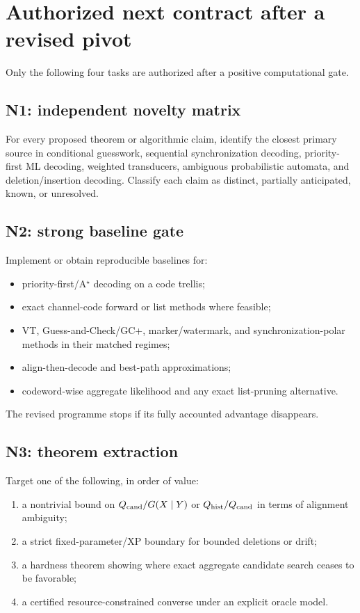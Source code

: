 \documentclass[11pt]{article}
\begin{document}
\section{Authorized next contract after a revised pivot}
Only the following four tasks are authorized after a positive computational gate.

\subsection{N1: independent novelty matrix}
For every proposed theorem or algorithmic claim, identify the closest primary source in conditional guesswork, sequential synchronization decoding, priority-first ML decoding, weighted transducers, ambiguous probabilistic automata, and deletion/insertion decoding. Classify each claim as distinct, partially anticipated, known, or unresolved.

\subsection{N2: strong baseline gate}
Implement or obtain reproducible baselines for:
\begin{itemize}
\item priority-first/A$^\star$ decoding on a code trellis;
\item exact channel-code forward or list methods where feasible;
\item VT, Guess-and-Check/GC+, marker/watermark, and synchronization-polar methods in their matched regimes;
\item align-then-decode and best-path approximations;
\item codeword-wise aggregate likelihood and any exact list-pruning alternative.
\end{itemize}
The revised programme stops if its fully accounted advantage disappears.

\subsection{N3: theorem extraction}
Target one of the following, in order of value:
\begin{enumerate}
\item a nontrivial bound on $Q_{\rm cand}/G(X\mid Y)$ or $Q_{\rm hist}/Q_{\rm cand}$ in terms of alignment ambiguity;
\item a strict fixed-parameter/XP boundary for bounded deletions or drift;
\item a hardness theorem showing where exact aggregate candidate search ceases to be favorable;
\item a certified resource-constrained converse under an explicit oracle model.
\end{enumerate}
\end{document}
